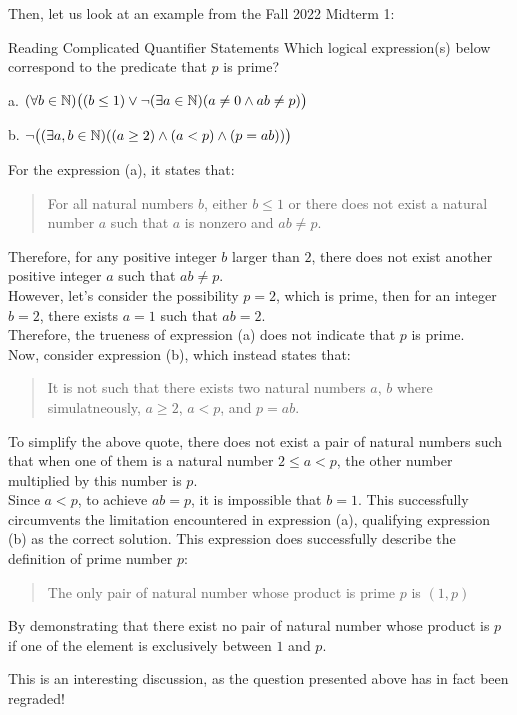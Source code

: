 Then, let us look at an example from the Fall 2022 Midterm 1:
\begin{ln-practice}{Reading Complicated Quantifier Statements}{}
    Which logical expression(s) below correspond to the predicate that $p$ is prime? \\
    \begin{bindenum}
        \item[a.] $(\forall b \in \mathbb{N}) \big( (b \leq 1) \lor \neg(\exists a \in \mathbb{N})(a \neq 0 \land ab \neq p) \big)$
        \item[b.] $\neg\big( (\exists a, b \in \mathbb{N}) ((a \geq 2) \land (a < p) \land (p = ab)) \big)$
    \end{bindenum}
    \tcblower
    For the expression (a), it states that:
    \begin{quote}
        For all natural numbers $b$, either $b \leq 1$ or there does not exist a natural number $a$ such that $a$ is nonzero and $ab \neq p$. \\
    \end{quote}
    Therefore, for any positive integer $b$ larger than $2$, there does not exist another positive integer $a$ such that $ab \neq p$. \\
    However, let's consider the possibility $p = 2$, which is prime, then for an integer $b = 2$, there exists $a = 1$ such that $ab = 2$. \\
    Therefore, the trueness of expression (a) does not indicate that $p$ is prime. \\

    Now, consider expression (b), which instead states that:
    \begin{quote}
        It is not such that there exists two natural numbers $a$, $b$ where simulatneously, $a \geq 2$, $a < p$, and $p = ab$.
    \end{quote}
    To simplify the above quote, there does not exist a pair of natural numbers such that when one of them is a natural number $2 \leq a < p$, the other number multiplied by this number is $p$. \\
    Since $a < p$, to achieve $ab = p$, it is impossible that $b = 1$. This successfully circumvents the limitation encountered in expression (a), qualifying expression (b) as the correct solution. This expression does successfully describe the definition of prime number $p$:
    \begin{quote}
        The only pair of natural number whose product is prime $p$ is $(1, p)$
    \end{quote}
    By demonstrating that there exist no pair of natural number whose product is $p$ if one of the element is exclusively between $1$ and $p$.
\end{ln-practice}
This is an interesting discussion, as the question presented above has in fact been regraded!

